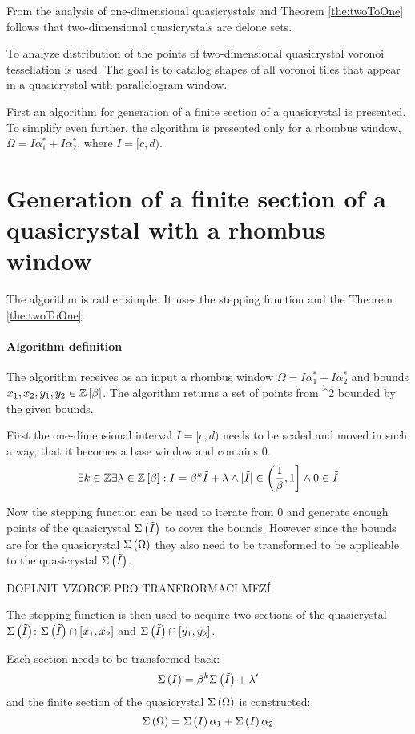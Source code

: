 \documentclass[text.tex]{subfiles}
\begin{document}
From the analysis of one-dimensional quasicrystals and Theorem \ref{the:twoToOne} follows that two-dimensional quasicrystals are delone sets.  

To analyze distribution of the points of two-dimensional quasicrystal voronoi tessellation is used. The goal is to catalog shapes of all voronoi tiles that appear in a quasicrystal with parallelogram window. 

First an algorithm for generation of a finite section of a quasicrystal is presented. To simplify even further, the algorithm is presented only for a rhombus window, $\Omega = I\alpha_1^\ast + I\alpha_2^\ast$, where $I = [c,d)$.

\section{Generation of a finite section of a quasicrystal with a rhombus window}
The algorithm is rather simple. It uses the stepping function and the Theorem \ref{the:twoToOne}. 

\paragraph{Algorithm definition} The algorithm receives as an input a rhombus window $\Omega = I\alpha_1^\ast + I\alpha_2^\ast$ and bounds $x_1, x_2, y_1, y_2 \in \mathbb{Z}\left[\beta\right]$.
The algorithm returns a set of points from $\ring^2$ bounded by the given bounds.

First the one-dimensional interval $I = [c,d)$ needs to be scaled and moved in such a way, that it becomes a base window and contains $0$.
$$\exists k\in\mathbb{Z} \exists \lambda\in\mathbb{Z}\left[\beta\right] : I = \beta^k\tilde{I}+\lambda \wedge |\tilde{I}| \in \left(\frac{1}{\beta},1\right] \wedge 0\in\tilde{I}$$

Now the stepping function can be used to iterate from 0 and generate enough points of the quasicrystal $\Sigma\left(\tilde{I}\right)$ to cover the bounds. However since the bounds are for the quasicrystal $\Sigma\left(\Omega\right)$ they also need to be transformed to be applicable to the quasicrystal $\Sigma\left(\tilde{I}\right)$. 

DOPLNIT VZORCE PRO TRANFRORMACI MEZÍ

The stepping function is then used to acquire two sections of the quasicrystal $\Sigma\left(\tilde{I}\right)$: $\Sigma\left(\tilde{I}\right)\cap[\tilde{x_1},\tilde{x_2}]$ and $\Sigma\left(\tilde{I}\right)\cap[\tilde{y_1},\tilde{y_2}]$.

Each section needs to be transformed back:
$$\Sigma\left(I\right) = \beta^k\Sigma\left(\tilde{I}\right) + \lambda'$$
and the finite section of the quasicrystal $\Sigma\left(\Omega\right)$ is constructed:
$$\Sigma\left(\Omega\right) = \Sigma\left(I\right)\alpha_1 + \Sigma\left(I\right)\alpha_2$$
\end{document}
